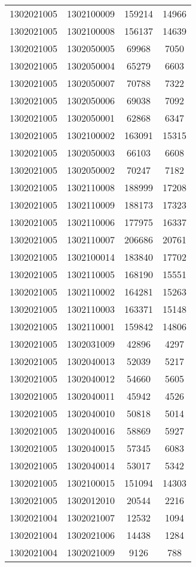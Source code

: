 \begin{longtable}[h]{llcc}
		1302021005 & 1302100009 & 159214 & 14966\\
		1302021005 & 1302100008 & 156137 & 14639\\
		1302021005 & 1302050005 & 69968 & 7050\\
		1302021005 & 1302050004 & 65279 & 6603\\
		1302021005 & 1302050007 & 70788 & 7322\\
		1302021005 & 1302050006 & 69038 & 7092\\
		1302021005 & 1302050001 & 62868 & 6347\\
		1302021005 & 1302100002 & 163091 & 15315\\
		1302021005 & 1302050003 & 66103 & 6608\\
		1302021005 & 1302050002 & 70247 & 7182\\
		1302021005 & 1302110008 & 188999 & 17208\\
		1302021005 & 1302110009 & 188173 & 17323\\
		1302021005 & 1302110006 & 177975 & 16337\\
		1302021005 & 1302110007 & 206686 & 20761\\
		1302021005 & 1302100014 & 183840 & 17702\\
		1302021005 & 1302110005 & 168190 & 15551\\
		1302021005 & 1302110002 & 164281 & 15263\\
		1302021005 & 1302110003 & 163371 & 15148\\
		1302021005 & 1302110001 & 159842 & 14806\\
		1302021005 & 1302031009 & 42896 & 4297\\
		1302021005 & 1302040013 & 52039 & 5217\\
		1302021005 & 1302040012 & 54660 & 5605\\
		1302021005 & 1302040011 & 45942 & 4526\\
		1302021005 & 1302040010 & 50818 & 5014\\
		1302021005 & 1302040016 & 58869 & 5927\\
		1302021005 & 1302040015 & 57345 & 6083\\
		1302021005 & 1302040014 & 53017 & 5342\\
		1302021005 & 1302100015 & 151094 & 14303\\
		1302021005 & 1302012010 & 20544 & 2216\\
		1302021004 & 1302021007 & 12532 & 1094\\
		1302021004 & 1302021006 & 14438 & 1284\\
		1302021004 & 1302021009 & 9126 & 788\\

\end{longtable}
